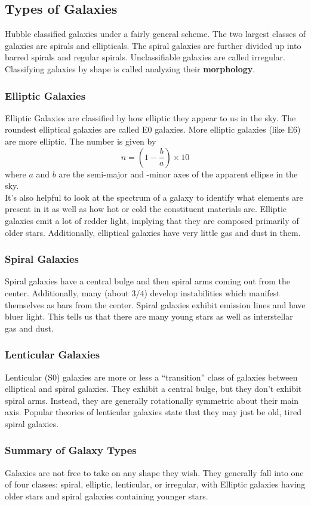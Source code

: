 \documentclass{article}
\begin{document}
	\subsection{Types of Galaxies}
	Hubble classified galaxies under a fairly general scheme. The two largest classes of galaxies are spirals and ellipticals. The spiral galaxies are further divided up into barred spirals and regular spirals. Unclassifiable galaxies are called irregular. Classifying galaxies by shape is called analyzing their \textbf{morphology}.
	\subsubsection{Elliptic Galaxies}
	Elliptic Galaxies are classified by how elliptic they appear to us in the sky. The roundest elliptical galaxies are called E0 galaxies. More elliptic galaxies (like E6) are more elliptic. The number is given by
	$$n=\left(1-\frac{b}{a}\right)\times 10$$
	where $a$ and $b$ are the semi-major and -minor axes of the apparent ellipse in the sky.\\
	
	\noindent
	It's also helpful to look at the spectrum of a galaxy to identify what elements are present in it as well as how hot or cold the constituent materials are. Elliptic galaxies emit a lot of redder light, implying that they are composed primarily of older stars. Additionally, elliptical galaxies have very little gas and dust in them.
	\subsubsection{Spiral Galaxies}
	Spiral galaxies have a central bulge and then spiral arms coming out from the center. Additionally, many (about $3/4$) develop instabilities which manifest themselves as bars from the center. Spiral galaxies exhibit emission lines and have bluer light. This tells us that there are many young stars as well as interstellar gas and dust. 
	\subsubsection{Lenticular Galaxies}
	Lenticular (S0) galaxies are more or less a ``transition'' class of galaxies between elliptical and spiral galaxies. They exhibit a central bulge, but they don't exhibit spiral arms. Instead, they are generally rotationally symmetric about their main axis. Popular theories of lenticular galaxies state that they may just be old, tired spiral galaxies.
	\subsubsection{Summary of Galaxy Types}
	Galaxies are not free to take on any shape they wish. They generally fall into one of four classes: spiral, elliptic, lenticular, or irregular, with Elliptic galaxies having older stars and spiral galaxies containing younger stars.
\end{document}
